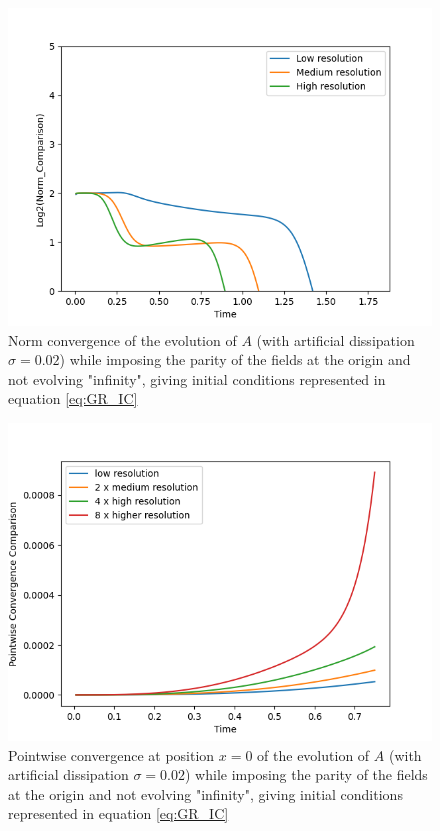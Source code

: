 \begin{figure}[t!]
    \centering
    \includegraphics[width=\columnwidth]{Images/A-norm.png}
    \caption{Norm convergence of the evolution of $A$ (with artificial dissipation $\sigma = 0.02$) while imposing the parity of the fields at the origin and not evolving "infinity", giving initial conditions represented in equation \eqref{eq:GR_IC}}
    \label{fig:norm_A}
\end{figure}

\begin{figure}[t!]
    \centering
    \includegraphics[width=\columnwidth]{Images/A-point.png}
    \caption{Pointwise convergence at position $x = 0$ of the evolution of $A$ (with artificial dissipation $\sigma = 0.02$) while imposing the parity of the fields at the origin and not evolving "infinity", giving initial conditions represented in equation \eqref{eq:GR_IC}}
    \label{fig:point_A}
\end{figure}

